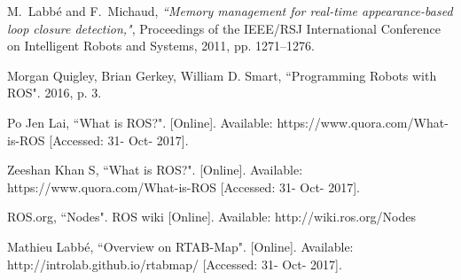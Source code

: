 \documentclass[journal]{IEEEtran}
\begin{document}
%
%
%
\begin{thebibliography}{1}

M.~Labbé and F.~Michaud, \emph{``Memory management for real-time appearance-based loop closure detection,"},
Proceedings of the IEEE/RSJ International Conference on Intelligent Robots and Systems, 2011, pp. 1271–1276.

Morgan Quigley, Brian Gerkey, William D. Smart, ``Programming Robots with ROS". 2016, p. 3.

Po Jen Lai, ``What is ROS?". [Online]. Available: 
https://www.quora.com/What-is-ROS
[Accessed: 31- Oct- 2017].

Zeeshan Khan S, ``What is ROS?". [Online]. Available: 
https://www.quora.com/What-is-ROS
[Accessed: 31- Oct- 2017].

ROS.org, ``Nodes". ROS wiki [Online]. Available: http://wiki.ros.org/Nodes

Mathieu Labbé, ``Overview on RTAB-Map". [Online]. Available: 
http://introlab.github.io/rtabmap/
[Accessed: 31- Oct- 2017].

\end{thebibliography}
\end{document}
